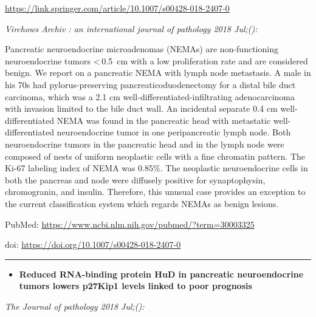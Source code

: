\documentclass[]{article}
\providecommand{\tightlist}{%
  \setlength{\itemsep}{0pt}\setlength{\parskip}{0pt}}
\begin{document}
\url{https://link.springer.com/article/10.1007/s00428-018-2407-0}

\emph{Virchows Archiv : an international journal of pathology 2018
Jul;():}

Pancreatic neuroendocrine microadenomas (NEMAs) are non-functioning
neuroendocrine tumors \textless{} 0.5~cm with a low proliferation rate
and are considered benign. We report on a pancreatic NEMA with lymph
node metastasis. A male in his 70s had pylorus-preserving
pancreaticoduodenectomy for a distal bile duct carcinoma, which was a
2.1 cm well-differentiated-infiltrating adenocarcinoma with invasion
limited to the bile duct wall. An incidental separate 0.4 cm
well-differentiated NEMA was found in the pancreatic head with
metastatic well-differentiated neuroendocrine tumor in one
peripancreatic lymph node. Both neuroendocrine tumors in the pancreatic
head and in the lymph node were composed of nests of uniform neoplastic
cells with a fine chromatin pattern. The Ki-67 labeling index of NEMA
was 0.85\%. The neoplastic neuroendocrine cells in both the pancreas and
node were diffusely positive for synaptophysin, chromogranin, and
insulin. Therefore, this unusual case provides an exception to the
current classification system which regards NEMAs as benign lesions.

PubMed: \url{https://www.ncbi.nlm.nih.gov/pubmed/?term=30003325}

doi: \url{https://doi.org/10.1007/s00428-018-2407-0}

{}

{}

\begin{center}\rule{0.5\linewidth}{\linethickness}\end{center}

\begin{itemize}
\tightlist
\item
  \textbf{Reduced RNA-binding protein HuD in pancreatic neuroendocrine
  tumors lowers p27Kip1 levels linked to poor prognosis}
\end{itemize}

\emph{The Journal of pathology 2018 Jul;():}
\end{document}
